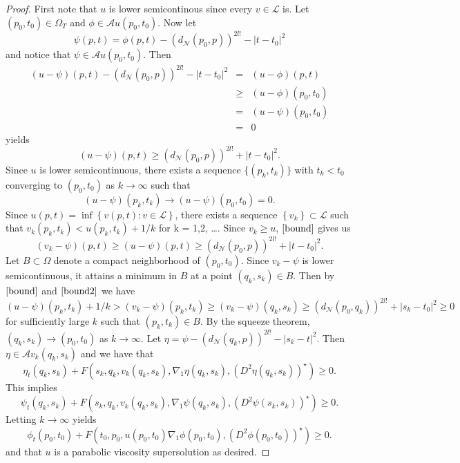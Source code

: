 \documentclass[12pt]{amsart}
\theoremstyle{definition}
\theoremstyle{remark}
\numberwithin{equation}{section}
\begin{document}
\begin{proof}
First note that $u$ is lower semicontinous since every $v \in \mathcal{L}$ is.  Let $(p_0,t_0) \in \Omega_T$ and $\phi \in \mathcal{A}u(p_0,t_0)$.  Now let 
$$\psi(p,t) = \phi(p,t) - \left(d_\mathcal{N}(p_0,p)\right)^{2l!} - |t-t_0|^2$$
and notice that $\psi \in \mathcal{A}u(p_0,t_0)$.
Then
\begin{eqnarray*}
(u-\psi)(p,t) - \left(d_\mathcal{N}(p_0,p)\right)^{2l!} - |t-t_0|^2 &=& (u-\phi)(p,t) \\&\geq& (u-\phi)(p_0,t_0) \\&=& (u-\psi)(p_0,t_0) \\&=& 0
\end{eqnarray*}
yields
\begin{equation}\label{bound}
(u-\psi)(p,t) \geq \left(d_\mathcal{N}(p_0,p)\right)^{2l!} + |t-t_0|^2.
\end{equation}
Since $u$ is lower semicontinuous, there exists a sequence $\{(p_k,t_k)\}$ with $t_k < t_0$ converging to $(p_0,t_0)$ as $k \to \infty$ such that 
$$(u-\psi)(p_k,t_k) \to (u-\psi)(p_0,t_0) = 0.$$
Since $u(p,t) = \inf \left\{ v(p,t): v \in \mathcal{L}\right\}$, there exists a sequence $\left\{v_k\right\} \subset \mathcal{L}$ such that $v_k(p_k,t_k) < u(p_k,t_k) + 1/k$ for k = 1,2, \ldots.  Since $v_k \geq u$, $\eqref{bound}$ gives us
\begin{equation}\label{bound2}
(v_k - \psi)(p,t) \geq (u-\psi)(p,t) \geq\left(d_\mathcal{N}(p_0,p)\right)^{2l!} + |t-t_0|^2.
\end{equation}
Let $B \subset \Omega$ denote a compact neighborhood of $(p_0,t_0)$.  Since $v_k-\psi$ is lower semicontinuous, it attains a minimum in $B$ at a point $(q_k,s_k) \in B$.  Then by $\eqref{bound}$ and $\eqref{bound2}$ we have 
$$ (u-\psi)(p_k,t_k) + 1/k > (v_k - \psi)(p_k,t_k) \geq (v_k - \psi)(q_k,s_k) \geq \left(d_\mathcal{N}(p_0,q_k)\right)^{2l!} + |s_k-t_0|^2 \geq 0$$
for sufficiently large $k$ such that $(p_k,t_k) \in B$.  By the squeeze theorem, $(q_k,s_k) \to (p_0,t_0)$ as $k \to \infty$.
Let $\eta = \psi - \left(d_\mathcal{N}(q_k,p)\right)^{2l!} - |s_k-t|^2$.  Then $\eta \in \mathcal{A}v_k(q_k,s_k)$ and we have that 
$$\eta_t(q_k,s_k)+F(s_k, q_k, v_k(q_k,s_k),\nabla_1\eta(q_k,s_k), (D^2 \eta(q_k,s_k))^\star) \geq 0.$$
This implies 
$$\psi_t(q_k,s_k)+F(s_k, q_k, v_k(q_k,s_k),\nabla_1\psi(q_k,s_k), (D^2 \psi(s_k,s_k))^\star)\geq 0.$$
Letting $k \to \infty$ yields 
$$\phi_t(p_0,t_0)+F(t_0,p_0,u(p_0,t_0)\nabla_1\phi(p_0,t_0), (D^2\phi(p_0,t_0))^\star)\geq 0.$$
and that $u$ is a parabolic viscosity supersolution as desired.
\end{proof}
\end{document}
